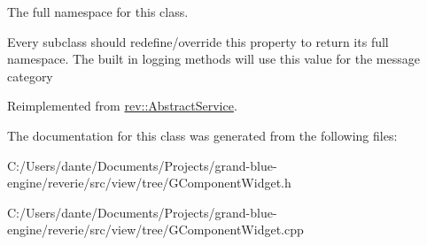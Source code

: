 The full namespace for this class. 

Every subclass should redefine/override this property to return its full namespace. The built in logging methods will use this value for the message category 

Reimplemented from \mbox{\hyperlink{classrev_1_1_abstract_service_a062e932eaa2eab0109288f2b32e459f7}{rev\+::\+Abstract\+Service}}.



The documentation for this class was generated from the following files\+:\begin{DoxyCompactItemize}
\item 
C\+:/\+Users/dante/\+Documents/\+Projects/grand-\/blue-\/engine/reverie/src/view/tree/G\+Component\+Widget.\+h\item 
C\+:/\+Users/dante/\+Documents/\+Projects/grand-\/blue-\/engine/reverie/src/view/tree/G\+Component\+Widget.\+cpp\end{DoxyCompactItemize}
